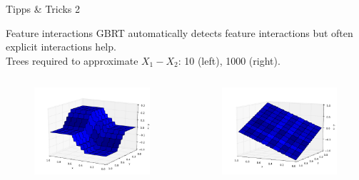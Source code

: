 \documentclass[a4paper,presentation]{beamer}
\begin{document}
\begin{frame}{Tipps \& Tricks 2}
  \begin{block}{Feature interactions}
     {\footnotesize GBRT automatically detects feature interactions but often explicit interactions help.\\Trees required to approximate $X_1 - X_2$: 10 (left), 1000 (right). }
     \vspace{-0.5cm}
     \begin{columns}[T]
    \begin{column}{.5\textwidth}
      \begin{figure}
         \centering
           \includegraphics[width=1.0\textwidth]{./images/func_approx_minus_2.pdf}
       \end{figure}
    \end{column}
    \begin{column}{.5\textwidth}
       \begin{figure}
         \centering
           \includegraphics[width=1.0\textwidth]{./images/func_approx_minus_3.pdf}
       \end{figure}
    \end{column}
    \end{columns}
  \end{block}
\end{frame}
\end{document}
